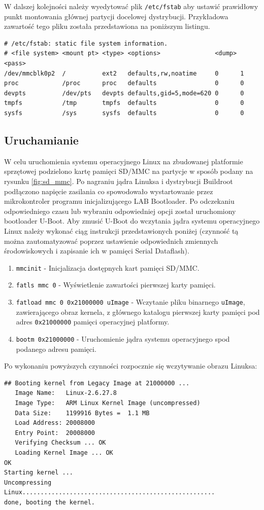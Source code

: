 \documentclass[a4paper,12pt]{book}
\begin{document}
				W dalszej kolejności należy wyedytować plik \texttt{/etc/fstab} aby ustawić prawidłowy punkt montowania głównej partycji docelowej dystrybucji. Przykładowa zawartość tego pliku została przedstawiona na poniższym listingu.
				\begin{lstlisting}[basicstyle={\footnotesize\ttfamily}]
# /etc/fstab: static file system information.
# <file system> <mount pt> <type> <options>               <dump> <pass>
/dev/mmcblk0p2  /          ext2   defaults,rw,noatime     0      1
proc            /proc      proc   defaults                0      0
devpts          /dev/pts   devpts defaults,gid=5,mode=620 0      0
tmpfs           /tmp       tmpfs  defaults                0      0
sysfs           /sys       sysfs  defaults                0      0	

				\end{lstlisting}
			\subsection{Uruchamianie}
				W celu uruchomienia systemu operacyjnego Linux na zbudowanej platformie sprzętowej podzielono kartę pamięci SD/MMC na partycje w sposób podany na rysunku \ref{fig:sd_mmc}. Po nagraniu jądra Linuksa i dystrybucji Buildroot podłączono napięcie zasilania co spowodowało wystartowanie przez mikrokontroler programu inicjalizującego LAB Bootloader. Po odczekaniu odpowiedniego czasu lub wybraniu odpowiedniej opcji został uruchomiony bootloader U-Boot. Aby zmusić U-Boot do wczytania jądra systemu operacyjnego Linux należy wykonać ciąg instrukcji przedstawionych poniżej (czynność tą można zautomatyzować poprzez ustawienie odpowiednich zmiennych środowiskowych i zapisanie ich w pamięci Serial Dataflash).
				\begin{enumerate}
					\item \texttt{mmcinit} - Inicjalizacja dostępnych kart pamięci SD/MMC.
					\item \texttt{fatls mmc 0} - Wyświetlenie zawartości pierwszej karty pamięci.
					\item \texttt{fatload mmc 0 0x21000000 uImage} - Wczytanie pliku binarnego \texttt{uImage}, zawierającego obraz kernela, z głównego katalogu pierwszej karty pamięci pod adres \texttt{0x21000000} pamięci operacyjnej platformy.
					\item \texttt{bootm 0x21000000} - Uruchomienie jądra systemu operacyjnego spod podanego adresu pamięci.
				\end{enumerate}
				Po wykonaniu powyższych czynności rozpocznie się wczytywanie obrazu Linuksa:
				\begin{lstlisting}[basicstyle={\footnotesize\ttfamily}]
## Booting kernel from Legacy Image at 21000000 ...
   Image Name:   Linux-2.6.27.8
   Image Type:   ARM Linux Kernel Image (uncompressed)
   Data Size:    1199916 Bytes =  1.1 MB
   Load Address: 20008000
   Entry Point:  20008000
   Verifying Checksum ... OK
   Loading Kernel Image ... OK
OK
Starting kernel ...
Uncompressing Linux.....................................................
done, booting the kernel.
				\end{lstlisting}
				
\end{document}
